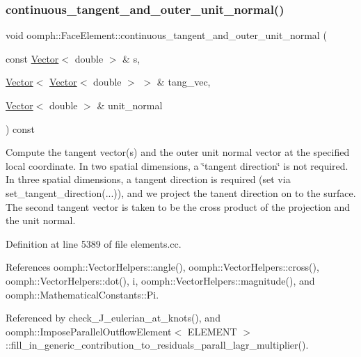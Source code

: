\subsubsection{\texorpdfstring{continuous\+\_\+tangent\+\_\+and\+\_\+outer\+\_\+unit\+\_\+normal()}{continuous\_tangent\_and\_outer\_unit\_normal()}\hspace{0.1cm}{\footnotesize\ttfamily [1/2]}}
{\footnotesize\ttfamily void oomph\+::\+Face\+Element\+::continuous\+\_\+tangent\+\_\+and\+\_\+outer\+\_\+unit\+\_\+normal (\begin{DoxyParamCaption}\item[{const \hyperlink{classoomph_1_1Vector}{Vector}$<$ double $>$ \&}]{s,  }\item[{\hyperlink{classoomph_1_1Vector}{Vector}$<$ \hyperlink{classoomph_1_1Vector}{Vector}$<$ double $>$ $>$ \&}]{tang\+\_\+vec,  }\item[{\hyperlink{classoomph_1_1Vector}{Vector}$<$ double $>$ \&}]{unit\+\_\+normal }\end{DoxyParamCaption}) const}



Compute the tangent vector(s) and the outer unit normal vector at the specified local coordinate. In two spatial dimensions, a \char`\"{}tangent direction\char`\"{} is not required. In three spatial dimensions, a tangent direction is required (set via set\+\_\+tangent\+\_\+direction(...)), and we project the tanent direction on to the surface. The second tangent vector is taken to be the cross product of the projection and the unit normal. 



Definition at line 5389 of file elements.\+cc.



References oomph\+::\+Vector\+Helpers\+::angle(), oomph\+::\+Vector\+Helpers\+::cross(), oomph\+::\+Vector\+Helpers\+::dot(), i, oomph\+::\+Vector\+Helpers\+::magnitude(), and oomph\+::\+Mathematical\+Constants\+::\+Pi.



Referenced by check\+\_\+\+J\+\_\+eulerian\+\_\+at\+\_\+knots(), and oomph\+::\+Impose\+Parallel\+Outflow\+Element$<$ E\+L\+E\+M\+E\+N\+T $>$\+::fill\+\_\+in\+\_\+generic\+\_\+contribution\+\_\+to\+\_\+residuals\+\_\+parall\+\_\+lagr\+\_\+multiplier().

\mbox{\label{classoomph_1_1FaceElement_a2114d937858d142142ea4f4e2342e7b9}} 
